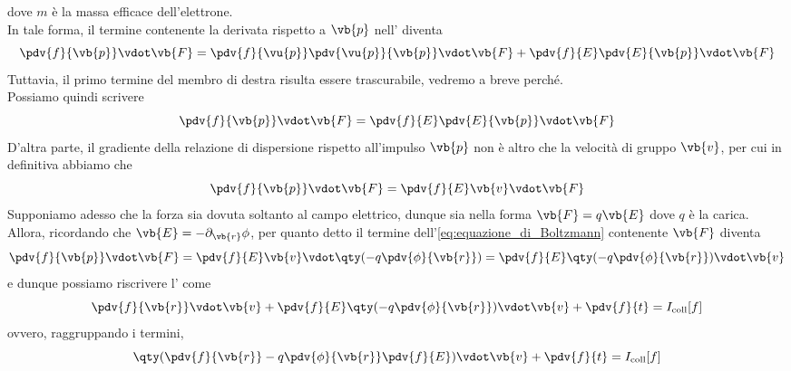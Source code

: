 dove $m$ è la massa efficace dell'elettrone.\\
In tale forma, il termine contenente la derivata rispetto a $\vb{p}$ nell' diventa
\begin{equation*}
    \pdv{f}{\vb{p}} \vdot \vb{F}
    =\pdv{f}{\vu{p}} \pdv{\vu{p}}{\vb{p}} \vdot \vb{F} + \pdv{f}{E} \pdv{E}{\vb{p}}\vdot \vb{F} 
\end{equation*}
Tuttavia, il primo termine del membro di destra risulta essere trascurabile, vedremo a breve perché.\\
Possiamo quindi scrivere
\begin{equation*}
    \pdv{f}{\vb{p}} \vdot \vb{F}
    =\pdv{f}{E} \pdv{E}{\vb{p}}\vdot \vb{F}
\end{equation*}
D'altra parte, il gradiente della relazione di dispersione rispetto all'impulso $\vb{p}$ non è altro che la velocità di gruppo $\vb{v}$, per cui in definitiva abbiamo che
\begin{equation*}
    \pdv{f}{\vb{p}} \vdot \vb{F}
    =\pdv{f}{E} \vb{v} \vdot \vb{F}
\end{equation*}
Supponiamo adesso che la forza sia dovuta soltanto al campo elettrico, dunque sia nella forma $\vb{F}=q\vb{E}$ dove $q$ è la carica. Allora, ricordando che $\vb{E}=-\partial_{\vb{r}} \phi$, per quanto detto il termine dell'\eqref{eq:equazione_di_Boltzmann} contenente $\vb{F}$ diventa
\begin{equation*}
    \pdv{f}{\vb{p}} \vdot \vb{F}
    =\pdv{f}{E} \vb{v} \vdot \qty( -q \pdv{\phi}{\vb{r}} )
    =\pdv{f}{E} \qty( -q \pdv{\phi}{\vb{r}} ) \vdot \vb{v}
\end{equation*}
e dunque possiamo riscrivere l' come
\begin{equation*}
    \pdv{f}{\vb{r}} \vdot \vb{v} + \pdv{f}{E} \qty( -q \pdv{\phi}{\vb{r}} ) \vdot \vb{v} + \pdv{f}{t}
    =I_{\rm coll}[f]
\end{equation*}
ovvero, raggruppando i termini,
\begin{equation}
    \qty( \pdv{f}{\vb{r}} - q \pdv{\phi}{\vb{r}} \pdv{f}{E} ) \vdot \vb{v} + \pdv{f}{t}
    =I_{\rm coll}[f]
    \label{eq:equazione_di_Boltzmann_con_campo}
\end{equation}
